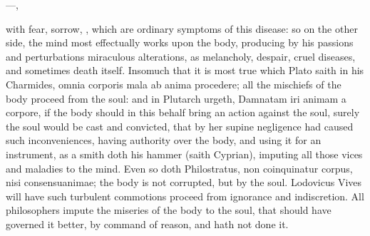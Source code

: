 {{---,

with fear, sorrow, \etc{}, which are ordinary symptoms of this disease: so
on the other side, the mind most effectually works upon the body,
producing by his passions and perturbations miraculous alterations, as
melancholy, despair, cruel diseases, and sometimes death itself.
Insomuch that it is most true which Plato saith in his Charmides, omnia
corporis mala ab anima procedere; all the mischiefs of the body
proceed from the soul: and \Democritus{} in Plutarch urgeth,
Damnatam iri animam a corpore, if the body should in this behalf bring
an action against the soul, surely the soul would be cast and
convicted, that by her supine negligence had caused such
inconveniences, having authority over the body, and using it for an
instrument, as a smith doth his hammer (saith Cyprian), imputing
all those vices and maladies to the mind. Even so doth
Philostratus, non coinquinatur corpus, nisi consensuanimae; the
body is not corrupted, but by the soul. Lodovicus Vives will have such
turbulent commotions proceed from ignorance and indiscretion. All
philosophers impute the miseries of the body to the soul, that should
have governed it better, by command of reason, and hath not done it.

}}
